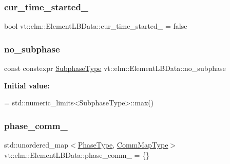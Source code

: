 \subsubsection{\texorpdfstring{cur\+\_\+time\+\_\+started\+\_\+}{cur\_time\_started\_}}
{\footnotesize\ttfamily bool vt\+::elm\+::\+Element\+L\+B\+Data\+::cur\+\_\+time\+\_\+started\+\_\+ = false\hspace{0.3cm}{\ttfamily [protected]}}

\mbox{\label{structvt_1_1elm_1_1_element_l_b_data_af93ba399701c539f3acbe75095e0d080}} 
\subsubsection{\texorpdfstring{no\+\_\+subphase}{no\_subphase}}
{\footnotesize\ttfamily const constexpr \hyperlink{namespacevt_ae78cbfdf1e57470e33eedb074f2beeba}{Subphase\+Type} vt\+::elm\+::\+Element\+L\+B\+Data\+::no\+\_\+subphase\hspace{0.3cm}{\ttfamily [static]}}

{\bfseries Initial value\+:}
\begin{DoxyCode}
=
    std::numeric\_limits<SubphaseType>::max()
\end{DoxyCode}
\mbox{\label{structvt_1_1elm_1_1_element_l_b_data_a343d66fb777c54e0bdaaddf6f54eda85}} 
\subsubsection{\texorpdfstring{phase\+\_\+comm\+\_\+}{phase\_comm\_}}
{\footnotesize\ttfamily std\+::unordered\+\_\+map$<$\hyperlink{namespacevt_a46ce6733d5cdbd735d561b7b4029f6d7}{Phase\+Type}, \hyperlink{namespacevt_1_1elm_a38487cb8896b9b4763efa9022fab560e}{Comm\+Map\+Type}$>$ vt\+::elm\+::\+Element\+L\+B\+Data\+::phase\+\_\+comm\+\_\+ = \{\}\hspace{0.3cm}{\ttfamily [protected]}}

